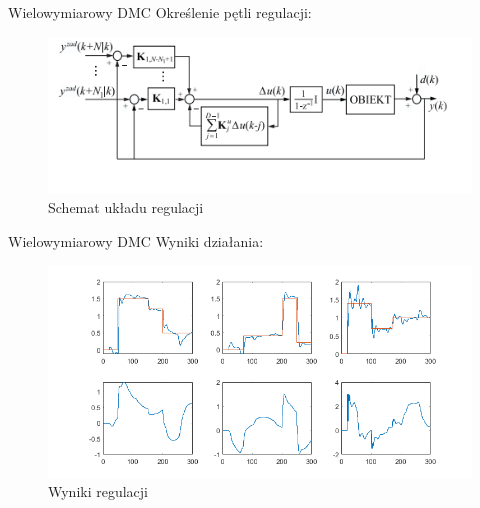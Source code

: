 \begin{frame}{Wielowymiarowy DMC}
Określenie pętli regulacji:
	\begin{center}
		\begin{figure}[H]
            		\includegraphics[scale=0.7]{images/SISODMC.png}
          			 \caption{Schemat układu regulacji}
		\end{figure}
	\end{center}
\end{frame}

\begin{frame}{Wielowymiarowy DMC}
Wyniki działania:
	\begin{center}
		\begin{figure}[H]
            		\includegraphics[scale=0.5]{images/PID_wyniki.png} %
          			 \caption{Wyniki regulacji}
		\end{figure}
	\end{center}
\end{frame}
